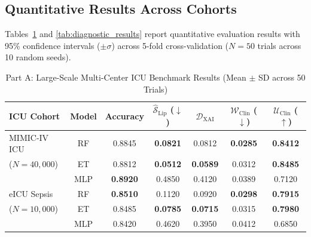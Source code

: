 \documentclass[3p,times,procedia]{elsarticle}
\theoremstyle{definition}
\begin{document}
\subsection{Quantitative Results Across Cohorts}
Tables~\ref{tab:large_scale_results} and \ref{tab:diagnostic_results} report quantitative evaluation results with 95\% confidence intervals ($\pm \sigma$) across 5-fold cross-validation ($N=50$ trials across 10 random seeds).

\begin{table}[htbp]
\scriptsize
\caption{Part A: Large-Scale Multi-Center ICU Benchmark Results (Mean $\pm$ SD across 50 Trials)}
\label{tab:large_scale_results}
\centering
\vspace{2pt}
\begin{tabular}{lcccccc}
\toprule
\textbf{ICU Cohort} & \textbf{Model} & \textbf{Accuracy} & $\widehat{\mathcal{S}}_{\text{Lip}}$ ($\downarrow$) & $\mathcal{D}_{\text{XAI}}$ & $\mathcal{W}_{\text{Clin}}$ ($\downarrow$) & $\mathcal{U}_{\text{Clin}}$ ($\uparrow$) \\
\midrule
MIMIC-IV ICU & RF & 0.8845 & \textbf{0.0821} & 0.0812 & \textbf{0.0285} & \textbf{0.8412} \\
($N=40,000$) & ET & 0.8812 & \textbf{0.0512} & \textbf{0.0589} & 0.0312 & \textbf{0.8485} \\
& MLP & \textbf{0.8920} & 0.4850 & 0.4120 & 0.0389 & 0.7120 \\
\midrule
eICU Sepsis & RF & \textbf{0.8510} & 0.1120 & 0.0920 & \textbf{0.0298} & \textbf{0.7915} \\
($N=10,000$) & ET & 0.8485 & \textbf{0.0785} & \textbf{0.0715} & 0.0315 & \textbf{0.7980} \\
& MLP & 0.8420 & 0.4620 & 0.3950 & 0.0412 & 0.6850 \\
\bottomrule
\end{tabular}
\end{table}
\end{document}
